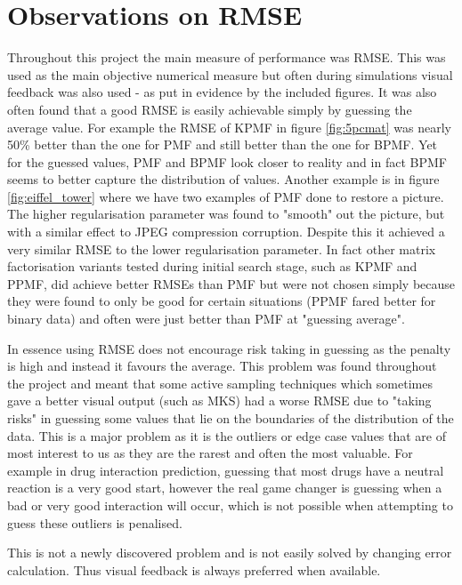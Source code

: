 \section{Observations on RMSE}
Throughout this project the main measure of performance was RMSE. This was used as the main objective numerical measure but often during simulations visual feedback was also used - as put in evidence by the included figures. It was also often found that a good RMSE is easily achievable simply by guessing the average value. For example the RMSE of  KPMF in figure \ref{fig:5pcmat} was nearly 50\% better than the one for PMF and still better than the one for BPMF. Yet for the guessed values, PMF and BPMF look closer to reality and in fact BPMF seems to better capture the distribution of values. Another example is in figure \ref{fig:eiffel_tower} where we have two examples of PMF done to restore a picture. The higher regularisation parameter was found to "smooth" out the picture, but with a similar effect to JPEG compression corruption. Despite this it achieved a very similar RMSE to the lower regularisation parameter. In fact other matrix factorisation variants tested during initial search stage, such as KPMF and PPMF\cite{shan2010generalized}, did achieve better RMSEs than PMF but were not chosen simply because they were found to only be good for certain situations (PPMF fared better for binary data) and often were just better than PMF at "guessing average".

In essence using RMSE does not encourage risk taking in guessing as the penalty is high and instead it favours the average. This problem was found throughout the project and meant that some active sampling techniques which sometimes gave a better visual output (such as MKS) had a worse RMSE due to "taking risks" in guessing some values that lie on the boundaries of the distribution of the data. This is a major problem as it is the outliers or edge case values that are of most interest to us as they are the rarest and often the most valuable. For example in drug interaction prediction, guessing that most drugs have a neutral reaction is a very good start, however the real game changer is guessing when a bad or very good interaction will occur, which is not possible when attempting to guess these outliers is penalised. 

This is not a newly discovered problem\cite{Wang09meansquared} and is not easily solved by changing error calculation. Thus  visual feedback is always preferred when available.


